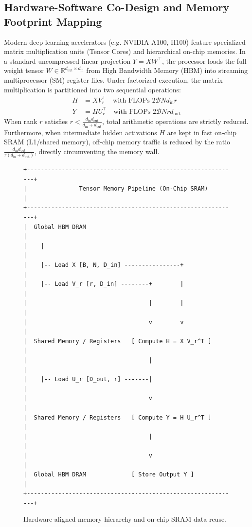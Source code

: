 \subsection{Hardware-Software Co-Design and Memory Footprint Mapping}
Modern deep learning accelerators (e.g. NVIDIA A100, H100) feature specialized matrix multiplication units (Tensor Cores) and hierarchical on-chip memories. In a standard uncompressed linear projection $Y = X W^\top$, the processor loads the full weight tensor $W \in \mathbb{R}^{d_{\text{out}} \times d_{\text{in}}}$ from High Bandwidth Memory (HBM) into streaming multiprocessor (SM) register files. Under factorized execution, the matrix multiplication is partitioned into two sequential operations:
\begin{align}
H &= X V_r^\top \quad \text{with FLOPs } 2 \mathcal{B} N d_{\text{in}} r \\
Y &= H U_r^\top \quad \text{with FLOPs } 2 \mathcal{B} N r d_{\text{out}}
\end{align}
When rank $r$ satisfies $r < \frac{d_{\text{in}} d_{\text{out}}}{d_{\text{in}} + d_{\text{out}}}$, total arithmetic operations are strictly reduced. Furthermore, when intermediate hidden activations $H$ are kept in fast on-chip SRAM (L1/shared memory), off-chip memory traffic is reduced by the ratio $\frac{d_{\text{in}} d_{\text{out}}}{r(d_{\text{in}} + d_{\text{out}})}$, directly circumventing the memory wall.

\begin{figure}[H]
\centering
\begin{verbatim}
+-------------------------------------------------------------+
|               Tensor Memory Pipeline (On-Chip SRAM)         |
+-------------------------------------------------------------+
|  Global HBM DRAM                                            |
|    |                                                        |
|    |-- Load X [B, N, D_in] ----------------+                |
|    |-- Load V_r [r, D_in] --------+        |                |
|                                   |        |                |
|                                   v        v                |
|  Shared Memory / Registers   [ Compute H = X V_r^T ]        |
|                                   |                         |
|    |-- Load U_r [D_out, r] -------|                         |
|                                   v                         |
|  Shared Memory / Registers   [ Compute Y = H U_r^T ]        |
|                                   |                         |
|                                   v                         |
|  Global HBM DRAM             [ Store Output Y ]             |
+-------------------------------------------------------------+
\end{verbatim}
\caption{Hardware-aligned memory hierarchy and on-chip SRAM data reuse.}
\label{fig:memory_hierarchy}
\end{figure}

